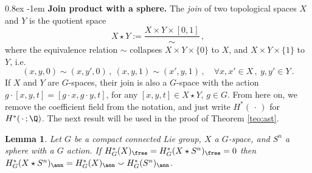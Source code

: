 \documentclass[11pt,a4paper,reqno]{article}
\makeatletter
\renewcommand{\paragraph}{%
  \@startsection{paragraph}{4}{\z@}%
  {0.8ex}  %
  {-1em}   %
  {\normalfont\bfseries}%
}
\numberwithin{equation}{section}
\newtheorem{lemma}[theorem]{Lemma}
\theoremstyle{definition}
\makeatother
\begin{document}
\paragraph{\bf Join product with a sphere.}
The \emph{join} of two topological spaces $X$ and $Y$ is the quotient space
\begin{equation}\label{defjoin}
X \star Y
:=
\frac{X\times Y\times[0,1]}\sim \, ,
\end{equation}
 where the equivalence relation $\sim$ collapses $X\times Y\times\{0\}$ to  $X$,  and $X\times Y\times\{1\}$  to $Y$, i.e.
\begin{equation}
\label{eqrela}
(x,y,0)\sim(x,y',0) \, ,\
(x,y,1)\sim(x',y,1) \, ,\quad
\forall x,x'\in X \, ,\ y,y'\in Y \, .
\end{equation}
If $X$ and $Y$ are $G$-spaces, their join is also a $G$-space with the action
$ g\cdot [x,y,t]=[g\cdot x,g\cdot y,t] $, for any $
 [x,y,t]\in X \star Y $, 
 $ g\in G $.
 From here on, we remove the coefficient field from the notation, and just write $H^*(\,\cdot\,)$ for $H^*(\,\cdot\,;\Q)$. The next result will be used in the proof of  Theorem \ref{teo:ast}.

\begin{lemma}\label{lm:join}
Let $G$ be a compact connected Lie group, $X$ a $G$-space, and $S^n$ a sphere with a $G$ action. If $H^*_G(X)_\free=H^*_G(X \star S^n)_\free=0$ then
$ H^*_G(X\star S^n)_\ann 
= 
H^*_G(X)_\ann \smallsmile H^*_G(S^n)_\ann $. 
\end{lemma}
\end{document}
